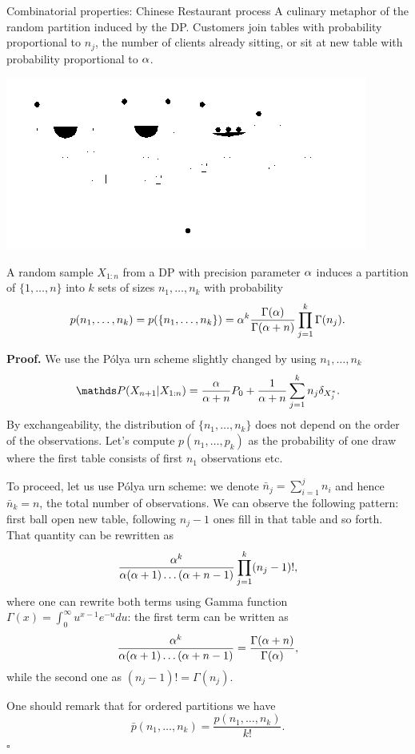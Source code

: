 \begin{frame}[allowframebreaks]{Combinatorial properties: Chinese Restaurant process}
A culinary metaphor of the \alert{random partition} induced by the DP. Customers join tables with probability proportional to \alert{$n_j$}, the number of clients already sitting, or sit at new table with probability  proportional to \alert{$\alpha$}.
\begin{center}
	\includegraphics[width = .5\textwidth]{figures_julyan/intro_DP/CRP}
\end{center}

\begin{proposition}
A random sample $X_{1:n}$ from a DP with precision parameter $\alpha$ induces a partition of $\{1,\ldots,n\}$ into $k$ sets of sizes $n_1,\ldots,n_k$ with probability 
\begin{equation*}
    p(n_1,\ldots,n_k)=p(\{n_1,\ldots,n_k\})=\alpha^k\frac{\Gamma(\alpha)}{\Gamma(\alpha+n)}\prod_{j=1}^k\Gamma (n_j).
\end{equation*}
\end{proposition}

\framebreak
\textbf{Proof.}
	We use the P\'olya urn scheme slightly changed by using $n_1,\ldots, n_k$
\begin{equation*}
    \P(X_{n+1}|X_{1:n})=\frac{\PrecisonParam}{\PrecisonParam + n}P_0 + \frac{1}{\PrecisonParam + n}\sum_{j=1}^kn_j\delta_{X^*_j}.
\end{equation*}
    By exchangeability, the distribution of $\{n_1,\ldots, n_k\}$ does not depend on the order of the observations. Let's compute $p(n_1,\ldots, p_k)$ as the probability of one draw where the first table consists of first $n_1$ observations etc. 
    
    To proceed, let us use P\'olya urn scheme: we denote $\bar{n}_j=\sum_{i=1}^jn_i$ and hence $\bar{n}_k=n$, the total number of observations. We can observe the following pattern: first ball open new table, following $n_j-1$ ones fill in that table and so forth. That quantity can be rewritten as 
    $$
    \frac{\alpha^k}{\alpha(\alpha+1)\ldots(\alpha+n-1)}\prod_{j=1}^k(n_j-1)!,
    $$
where one can rewrite both terms using Gamma function $\Gamma(x)=\int_0^\infty u^{x-1}e^{-u}du$: the first  term  can be written as 
$$
\frac{\alpha^k}{\alpha(\alpha+1)\ldots(\alpha+n-1)}=\frac{\Gamma(\alpha+n)}{\Gamma(\alpha)},
$$
while the second one as
$(n_j-1)!=\Gamma(n_j)$.

One should remark that for ordered partitions we have 
$$
\bar{p}(n_1,\ldots,n_k)=\frac{p(n_1,\ldots,n_k)}{k!}.
$$
\hfill $\square$
\end{frame}


